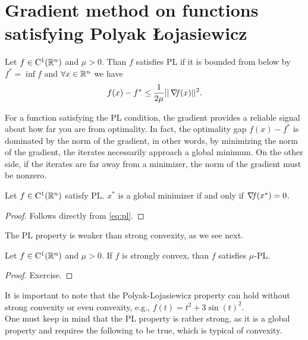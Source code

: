 \documentclass[10pt,a4paper]{article}
\begin{document}
\section{Gradient method on functions satisfying Polyak \L ojasiewicz}
\begin{definition} Let $f\in \mathord{\mathrm{C^1}}(\mathbb{R}^n)$ and $\mu>0$. Than $f$ satisfies PL if it is bounded from below by $f^*=\inf f$ and $\forall x\in \mathbb{R}^n$ we have 
\begin{equation}\label{eq:pl}
	f(x) - f^* \leq \frac{1}{2\mu} ||\operatorname*{\mathit{\nabla \!f}}(x)||^2.
\end{equation}
\end{definition}
\noindent For a function satisfying the PL condition, the gradient provides a reliable signal about how far you are from optimality. In fact, the optimality gap $f(x) - f^*$ is dominated by the norm of the gradient, in other words, by minimizing the norm of the gradient, the iterates necessarily approach a global minimum. On the other side, if the iterates are far away from a minimizer, the norm of the gradient must be nonzero. 
\begin{lemma}
	Let $f\in \mathord{\mathrm{C^1}}(\mathbb{R}^n)$ satisfy PL. $x^*$ is a global minimizer if and only if $\operatorname*{\mathit{\nabla \!f}}(x^*)=0$.
\end{lemma}
\begin{proof}
	Follows directly from \eqref{eq:pl}.
\end{proof}
\noindent The PL property is weaker than strong convexity, as we see next.
\begin{lemma}
	Let $f\in \mathord{\mathrm{C^1}}(\mathbb{R}^n)$ and $\mu>0$. If $f$ is strongly convex, than $f$ satisfies $\mu$-PL.
\end{lemma}
\begin{proof}
	Exercise.
\end{proof}
It is important to note that the Polyak-Lojasiewicz property can hold without strong convexity
or even convexity, e.g., $f(t)=t^2+3\sin(t)^2$.\\
One must keep in mind that the PL property is rather strong, as it is a global property and
requires the following to be true, which is typical of convexity.
\end{document}
